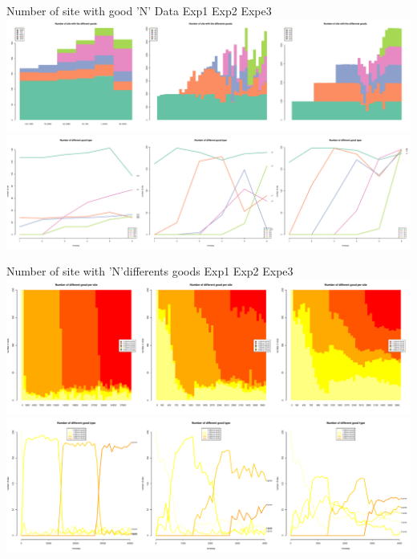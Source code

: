 \documentclass[12pt, notes=show]{beamer}
\begin{document}
\begin{frame}{Number of site with good 'N'}
    \small
Data \hfill Exp1 \hfill Exp2 \hfill Expe3 
	\includegraphics[width=\textwidth]{../images/hmNbSiteWGoodN.pdf}\\
	\includegraphics[width=\textwidth]{../images/plotNbSiteWGoodN.pdf}\\
\end{frame}

\begin{frame}{Number of site with 'N'differents goods}
    \centering
    \tiny
 Exp1 \hfill Exp2 \hfill Expe3 
	\includegraphics[width=.95\textwidth]{../images/hmNbGoodPerSite.pdf}\\
	\vfil
	\includegraphics[width=.95\textwidth]{../images/plotNbGoodPerSite.pdf}\\
\end{frame}
\end{document}
